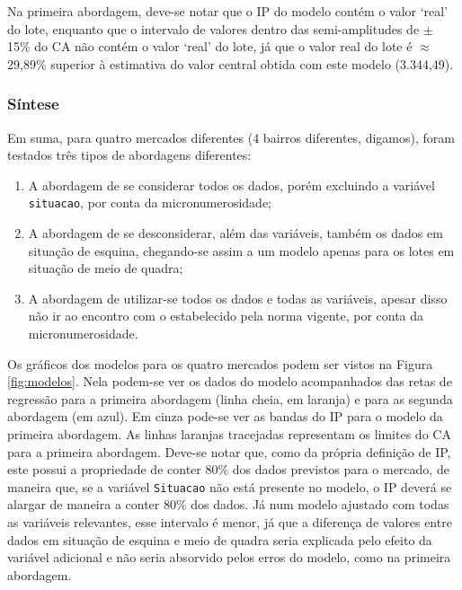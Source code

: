\documentclass[
  a4paper, 11pt]{article}
\begin{document}
Na primeira abordagem, deve-se notar que o IP do modelo contém o valor
`real' do lote, enquanto que o intervalo de valores dentro das
semi-amplitudes de \(\pm\) 15\% do CA não contém o valor `real' do lote,
já que o valor real do lote é \(\approx\) 29,89\% superior à estimativa
do valor central obtida com este modelo (3.344,49).

\hypertarget{suxedntese}{%
\subsubsection{Síntese}\label{suxedntese}}

Em suma, para quatro mercados diferentes (4 bairros diferentes,
digamos), foram testados três tipos de abordagens diferentes:

\begin{enumerate}
\def\labelenumi{\arabic{enumi}.}
\item
  A abordagem de se considerar todos os dados, porém excluindo a
  variável \texttt{situacao}, por conta da micronumerosidade;
\item
  A abordagem de se desconsiderar, além das variáveis, também os dados
  em situação de esquina, chegando-se assim a um modelo apenas para os
  lotes em situação de meio de quadra;
\item
  A abordagem de utilizar-se todos os dados e todas as variáveis, apesar
  disso não ir ao encontro com o estabelecido pela norma vigente, por
  conta da micronumerosidade.
\end{enumerate}

Os gráficos dos modelos para os quatro mercados podem ser vistos na
Figura \ref{fig:modelos}. Nela podem-se ver os dados do modelo
acompanhados das retas de regressão para a primeira abordagem (linha
cheia, em laranja) e para as segunda abordagem (em azul). Em cinza
pode-se ver as bandas do IP para o modelo da primeira abordagem. As
linhas laranjas tracejadas representam os limites do CA para a primeira
abordagem. Deve-se notar que, como da própria definição de IP, este
possui a propriedade de conter 80\% dos dados previstos para o mercado,
de maneira que, se a variável \texttt{Situacao} não está presente no
modelo, o IP deverá se alargar de maneira a conter 80\% dos dados. Já
num modelo ajustado com todas as variáveis relevantes, esse intervalo é
menor, já que a diferença de valores entre dados em situação de esquina
e meio de quadra seria explicada pelo efeito da variável adicional e não
seria absorvido pelos erros do modelo, como na primeira abordagem.
\end{document}
